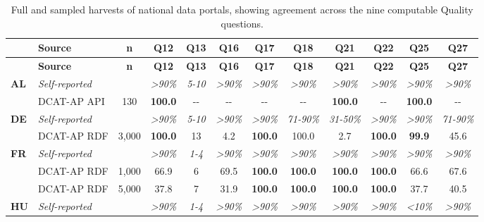 {\footnotesize\setlength{\tabcolsep}{3pt}
\begin{longtable}[]{@{}llcccccccccc@{}}
\caption{Full and sampled harvests of national data portals, showing agreement across the nine computable Quality questions.}\label{tab:harvests}\\
\toprule\noalign{}
 & \textbf{Source} & \textbf{n} & \textbf{Q12} & \textbf{Q13} & \textbf{Q16} & \textbf{Q17} & \textbf{Q18} & \textbf{Q21} & \textbf{Q22} & \textbf{Q25} & \textbf{Q27} \\
\midrule\noalign{}
\endfirsthead
\toprule\noalign{}
 & \textbf{Source} & \textbf{n} & \textbf{Q12} & \textbf{Q13} & \textbf{Q16} & \textbf{Q17} & \textbf{Q18} & \textbf{Q21} & \textbf{Q22} & \textbf{Q25} & \textbf{Q27} \\
\midrule\noalign{}
\endhead
\bottomrule\noalign{}
\endlastfoot
\textbf{AL} & \emph{Self-reported} & & \emph{\textgreater90\%} & \emph{5-10} & \emph{\textgreater90\%} & \emph{\textgreater90\%} & \emph{\textgreater90\%} & \emph{\textgreater90\%} & \emph{\textgreater90\%} & \emph{\textgreater90\%} & \emph{\textgreater90\%} \\
& DCAT-AP API & 130 & \textbf{100.0} & -\/- & -\/- & -\/- & -\/- & \textbf{100.0} & -\/- & \textbf{100.0} & -\/- \\
\textbf{DE} & \emph{Self-reported} & & \emph{\textgreater90\%} & \emph{5-10} & \emph{\textgreater90\%} & \emph{\textgreater90\%} & \emph{71-90\%} & \emph{31-50\%} & \emph{\textgreater90\%} & \emph{\textgreater90\%} & \emph{71-90\%} \\
& DCAT-AP RDF & 3,000 & \textbf{100.0} & 13 & 4.2 & \textbf{100.0} & 100.0 & 2.7 & \textbf{100.0} & \textbf{99.9} & 45.6 \\
\textbf{FR} & \emph{Self-reported} & & \emph{\textgreater90\%} & \emph{1-4} & \emph{\textgreater90\%} & \emph{\textgreater90\%} & \emph{\textgreater90\%} & \emph{\textgreater90\%} & \emph{\textgreater90\%} & \emph{\textgreater90\%} & \emph{\textgreater90\%} \\
& DCAT-AP RDF & 1,000 & 66.9 & 6 & 69.5 & \textbf{100.0} & \textbf{100.0} & \textbf{100.0} & \textbf{100.0} & 66.6 & 67.6 \\
& DCAT-AP RDF & 5,000 & 37.8 & 7 & 31.9 & \textbf{100.0} & \textbf{100.0} & \textbf{100.0} & \textbf{100.0} & 37.7 & 40.5 \\
\textbf{HU} & \emph{Self-reported} & & \emph{\textgreater90\%} & \emph{1-4} & \emph{\textgreater90\%} & \emph{\textgreater90\%} & \emph{\textgreater90\%} & \emph{\textgreater90\%} & \emph{\textgreater90\%} & \emph{\textless10\%} & \emph{\textgreater90\%} \\

\end{longtable}}

